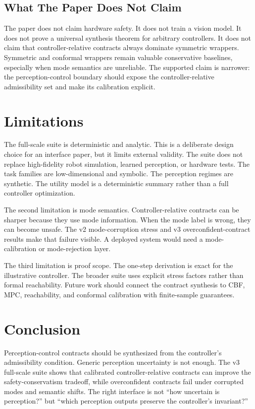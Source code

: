 \documentclass{article}
\begin{document}
\subsection{What The Paper Does Not Claim}

The paper does not claim hardware safety. It does not train a vision model. It does not prove a universal synthesis theorem for arbitrary controllers. It does not claim that controller-relative contracts always dominate symmetric wrappers. Symmetric and conformal wrappers remain valuable conservative baselines, especially when mode semantics are unreliable. The supported claim is narrower: the perception-control boundary should expose the controller-relative admissibility set and make its calibration explicit.

\section{Limitations}

The full-scale suite is deterministic and analytic. This is a deliberate design choice for an interface paper, but it limits external validity. The suite does not replace high-fidelity robot simulation, learned perception, or hardware tests. The task families are low-dimensional and symbolic. The perception regimes are synthetic. The utility model is a deterministic summary rather than a full controller optimization.

The second limitation is mode semantics. Controller-relative contracts can be sharper because they use mode information. When the mode label is wrong, they can become unsafe. The v2 mode-corruption stress and v3 overconfident-contract results make that failure visible. A deployed system would need a mode-calibration or mode-rejection layer.

The third limitation is proof scope. The one-step derivation is exact for the illustrative controller. The broader suite uses explicit stress factors rather than formal reachability. Future work should connect the contract synthesis to CBF, MPC, reachability, and conformal calibration with finite-sample guarantees.

\section{Conclusion}

Perception-control contracts should be synthesized from the controller's admissibility condition. Generic perception uncertainty is not enough. The v3 full-scale suite shows that calibrated controller-relative contracts can improve the safety-conservatism tradeoff, while overconfident contracts fail under corrupted modes and semantic shifts. The right interface is not ``how uncertain is perception?'' but ``which perception outputs preserve the controller's invariant?''
\end{document}
